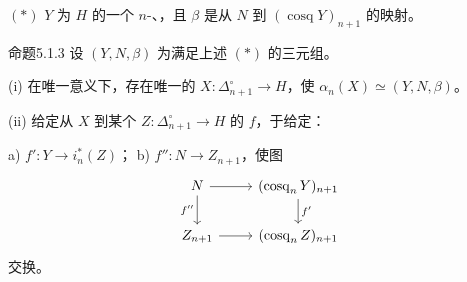 $(*)$ $Y$ 为 $H$ 的一个 $n$-、，且 $\beta$ 是从 $N$ 到 $(\operatorname{cosq}Y)_{n+1}$ 的映射。
\begin{SGAresult}{命题}{5.1.3}
设 $(Y,N,\beta)$ 为满足上述 $(*)$ 的三元组。

(i) 在唯一意义下，存在唯一的 $X:\Delta_{n+1}^\circ\to H$，使 $\alpha_n(X)\simeq(Y,N,\beta)$。

(ii) 给定从 $X$ 到某个 $Z:\Delta_{n+1}^\circ\to H$ 的 $f$，于给定：

 a)  $f':Y\to i_n^*(Z)$；
 b)  $f'':N\to Z_{n+1}$，使图
\[
\begin{tikzcd}
N\arrow[r]\arrow[d,"f''"']&(\operatorname{cosq}_nY)_{n+1}\arrow[d,"f'"]\\
Z_{n+1}\arrow[r]&(\operatorname{cosq}_nZ)_{n+1}
\end{tikzcd}
\]
交换。
\end{SGAresult}
